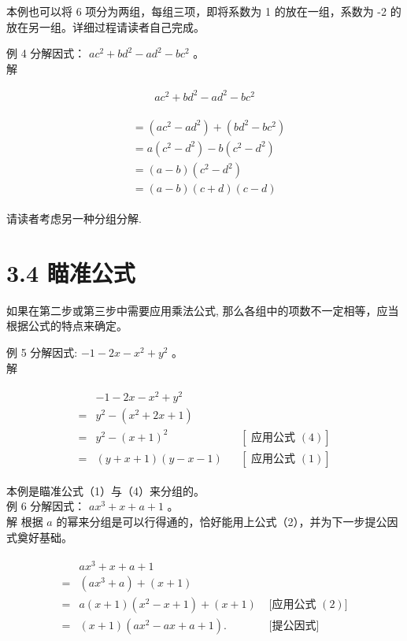 \documentclass[10pt]{article}
\begin{document}
本例也可以将 6 项分为两组，每组三项，即将系数为 1 的放在一组，系数为 -2 的放在另一组。详细过程请读者自己完成。

例 4 分解因式： $a c^{2}+b d^{2}-a d^{2}-b c^{2}$ 。\\
解

\begin{align*}
a c^{2}+b d^{2}-a d^{2}-b c^{2}
\end{align*}

\begin{align*}
\begin{aligned}
& =\left(a c^{2}-a d^{2}\right)+\left(b d^{2}-b c^{2}\right) \\
& =a\left(c^{2}-d^{2}\right)-b\left(c^{2}-d^{2}\right) \\
& =(a-b)\left(c^{2}-d^{2}\right) \\
& =(a-b)(c+d)(c-d)
\end{aligned}
\end{align*}

请读者考虑另一种分组分解.

\section*{3.4 瞄准公式}
如果在第二步或第三步中需要应用乘法公式, 那么各组中的项数不一定相等，应当根据公式的特点来确定。

例 5 分解因式: $-1-2 x-x^{2}+y^{2}$ 。\\
解

\begin{align*}
\begin{array}{rlrl} 
& -1-2 x-x^{2}+y^{2} & \\
= & y^{2}-\left(x^{2}+2 x+1\right) & & \\
= & y^{2}-(x+1)^{2} & & {[\text { 应用公式 }(4)]} \\
= & (y+x+1)(y-x-1) & & {[\text { 应用公式 }(1)]}
\end{array}
\end{align*}

本例是瞄准公式（1）与（4）来分组的。\\
例 6 分解因式： $a x^{3}+x+a+1$ 。\\
解 根据 $a$ 的幂来分组是可以行得通的，恰好能用上公式（2），并为下一步提公因式奠好基础。

\begin{align*}
\begin{array}{rlr} 
& a x^{3}+x+a+1 & \\
= & \left(a x^{3}+a\right)+(x+1) & \\
= & a(x+1)\left(x^{2}-x+1\right)+(x+1) & \text { [应用公式 }(2)] \\
= & (x+1)\left(a x^{2}-a x+a+1\right) . & \text { [提公因式] }
\end{array}
\end{align*}
\end{document}
